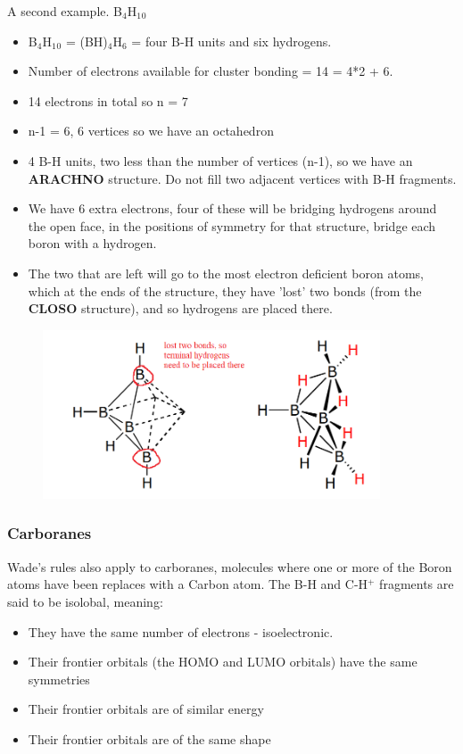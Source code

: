 \documentclass{article}
\renewcommand{\sup}[1]{\(^#1\)}
\newcommand{\sub}[1]{\(_#1\)}
\begin{document}
    \newpage

    A second example. B\sub{4}H\sub{1}\sub{0}
    
    \begin{itemize}
        \item B\sub{4}H\sub{1}\sub{0} = (BH)\sub{4}H\sub{6} = four B-H units and six hydrogens.
        \item Number of electrons available for cluster bonding = 14 = 4*2 + 6.
        \item 14 electrons in total so n = 7
        \item n-1 = 6, 6 vertices so we have an octahedron
        \item 4 B-H units, two less than the number of vertices (n-1), so we have an \textbf{ARACHNO} structure. Do not fill two adjacent vertices with B-H fragments.
        \item We have 6 extra electrons, four of these will be bridging hydrogens around the open face, in the positions of symmetry for that structure, bridge each boron with a hydrogen. 
        \item The two that are left will go to the most electron deficient boron atoms, which at the ends of the structure, they have 'lost' two bonds (from the \textbf{CLOSO} structure), and so hydrogens are placed there.
    \end{itemize}

    \begin{figure}[h]
        \centering
        \includegraphics[width=10cm]{term.png}
    \end{figure}

    \newpage

    \subsubsection{Carboranes}
    Wade's rules also apply to carboranes, molecules where one or more of the Boron atoms have been replaces with a Carbon atom.
    The B-H and C-H\sup{+} fragments are said to be isolobal, meaning:
    \begin{itemize}
        \item They have the same number of electrons - isoelectronic.
        \item Their frontier orbitals (the HOMO and LUMO orbitals) have the same symmetries
        \item Their frontier orbitals are of similar energy
        \item Their frontier orbitals are of the same shape 
    \end{itemize}
\end{document}
